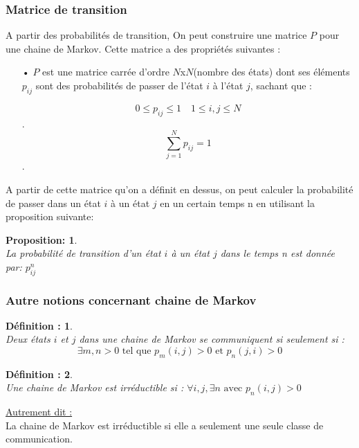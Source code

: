 \documentclass[a4paper,12pt]{report}
\newtheorem*{proposition}{Proposition:}
\newtheorem*{definition}{Définition :}
\begin{document}
\subsubsection*{Matrice de transition }
A partir des probabilités de transition, On peut construire une matrice $P$ pour une chaine de Markov.
Cette matrice a des propriétés suivantes :
\begin{itemize}
\item[•]$P$ est une matrice carrée d'ordre $N$x$N$(nombre des états) dont ses éléments $p_{ij}$ sont des probabilités de passer de l'état $i$ à l'état $j$, sachant que :

\[ 0\leq p_{ij}\leq 1 \quad 1\leq i,j\leq N \].
\[\sum_{j=1}^{N} p_{ij}=1\].

\end{itemize}
A partir de cette matrice qu'on a définit en dessus, on peut calculer la probabilité de passer dans un état $i$ à un état $j$ en un certain temps n en utilisant la proposition suivante:
\begin{proposition}\ \\
La probabilité de transition d'un état $i$ à un état $j$ dans le temps n est donnée par: $p_{ij}^n$
\end{proposition}
\subsubsection{Autre notions concernant chaine de Markov}
\begin{definition}\ \\
Deux états $i$ et $j$ dans une chaine de Markov se communiquent si seulement si :
\[ \exists m,n > 0 \text{ tel que } p_m(i,j)> 0 \text{ et }p_n(j,i)> 0 \]
\end{definition}
\begin{definition}\ \\
Une chaine de Markov est irréductible si :
$\forall i,j ,\exists n \text{ avec } p_n(i,j)>0$
\end{definition}
\underline{Autrement dit :} \\
La chaine de Markov est irréductible si elle a seulement une seule classe de communication.
\end{document}
